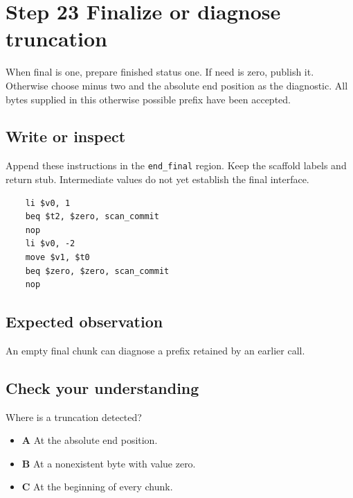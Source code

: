 \section{Step 23 Finalize or diagnose truncation}\label{utf8-s23}

When final is one, prepare finished status one. If need is zero, publish it. Otherwise choose minus two and the absolute end position as the diagnostic. All bytes supplied in this otherwise possible prefix have been accepted.

\subsection{Write or inspect}
Append these instructions in the \texttt{end\_final} region. Keep the scaffold labels and return stub. Intermediate values do not yet establish the final interface.

\begin{verbatim}
    li $v0, 1
    beq $t2, $zero, scan_commit
    nop
    li $v0, -2
    move $v1, $t0
    beq $zero, $zero, scan_commit
    nop
\end{verbatim}

\subsection{Expected observation}
An empty final chunk can diagnose a prefix retained by an earlier call.

\subsection{Check your understanding}
Where is a truncation detected?

\begin{itemize}
  \item \textbf{A} At the absolute end position.
  \item \textbf{B} At a nonexistent byte with value zero.
  \item \textbf{C} At the beginning of every chunk.
\end{itemize}

